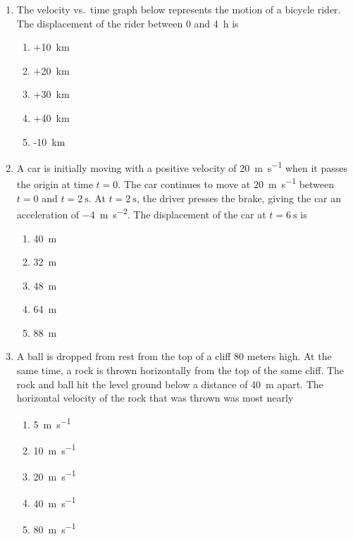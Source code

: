 \documentclass{../../../oss-apphys}
\begin{document}
\begin{multicols}{2}
\begin{enumerate}[resume,leftmargin=18pt]
  \item The velocity vs.\ time graph below represents the motion of a bicycle
    rider. The displacement of the rider between $0$ and \SI{4}{\hour} is
    \begin{center}
    \end{center}
    \begin{enumerate}[nosep,leftmargin=18pt,label=(\Alph*)]
    \item +\SI{10}{\kilo\metre}
    \item +\SI{20}{\kilo\metre}
    \item +\SI{30}{\kilo\metre}
    \item +\SI{40}{\kilo\metre}
    \item -\SI{10}{\kilo\metre}
    \end{enumerate}
    \columnbreak
    
  \item A car is initially moving with a positive velocity of
    \SI{20}{\metre\per\second} when it passes the origin at time $t=0$. The car
    continues to move at \SI{20}{\metre\per\second} between $t=0$ and
    $t=\SI{2}{\second}$. At $t=\SI{2}{\second}$, the driver presses the brake,
    giving the car an acceleration of \SI{-4}{\metre\per\second^2}. The
    displacement of the car at $t=\SI{6}{\second}$ is
    \begin{enumerate}[nosep,leftmargin=18pt,label=(\Alph*)]
    \item\SI{40}{\metre}
    \item\SI{32}{\metre}
    \item\SI{48}{\metre}
    \item\SI{64}{\metre}
    \item\SI{88}{\metre}
    \end{enumerate}

  \item A ball is dropped from rest from the top of a cliff $80$ meters high. At
    the same time, a rock is thrown horizontally from the top of the same
    cliff. The rock and ball hit the level ground below a distance of
    \SI{40}{\metre} apart. The horizontal velocity of the rock that was thrown
    was most nearly
    \begin{center}
      \vspace{-.15in}
    \end{center}
    \begin{enumerate}[nosep,leftmargin=18pt,label=(\Alph*)]
    \item\SI{5}{\metre\per\second}
    \item\SI{10}{\metre\per\second}
    \item\SI{20}{\metre\per\second}
    \item\SI{40}{\metre\per\second}
    \item\SI{80}{\metre\per\second}
    \end{enumerate}


\end{enumerate}
\end{multicols}
\end{document}

